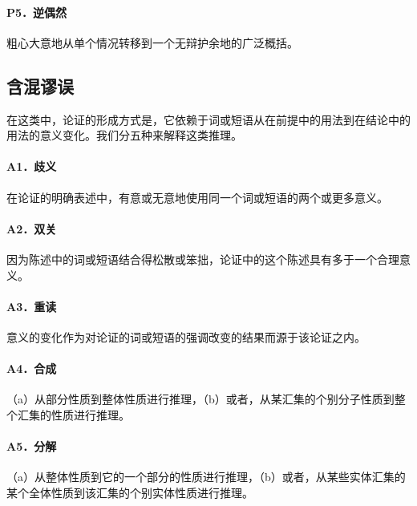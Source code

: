 \paragraph{P5．逆偶然}
粗心大意地从单个情况转移到一个无辩护余地的广泛概括。

\subsection*{含混谬误}
在这类中，论证的形成方式是，它依赖于词或短语从在前提中的用法到在结论中的用法的意义变化。我们分五种来解释这类推理。

\paragraph{A1．歧义}
在论证的明确表述中，有意或无意地使用同一个词或短语的两个或更多意义。

\paragraph{A2．双关}
因为陈述中的词或短语结合得松散或笨拙，论证中的这个陈述具有多于一个合理意义。

\paragraph{A3．重读}
意义的变化作为对论证的词或短语的强调改变的结果而源于该论证之内。

\paragraph{A4．合成}
（a）从部分性质到整体性质进行推理，（b）或者，从某汇集的个别分子性质到整个汇集的性质进行推理。

\paragraph{A5．分解}
（a）从整体性质到它的一个部分的性质进行推理，（b）或者，从某些实体汇集的某个全体性质到该汇集的个别实体性质进行推理。

\begin{center}
\end{center}

